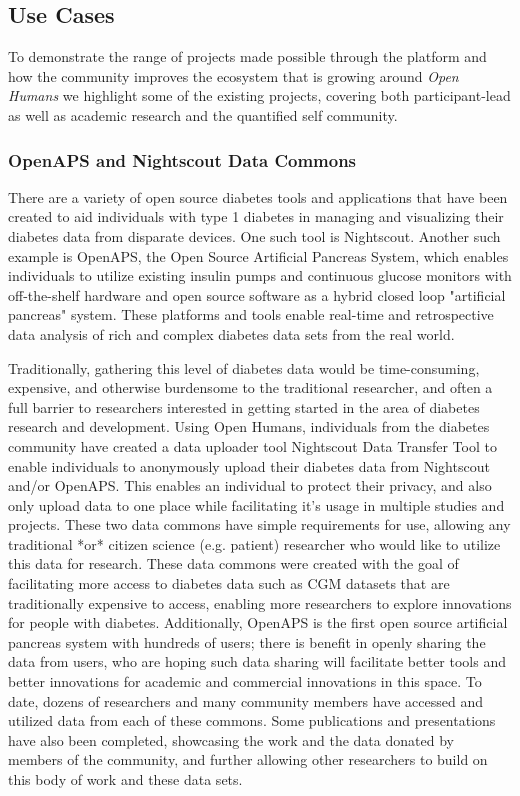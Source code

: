 \documentclass[a4paper,num-refs]{oup-contemporary}
\begin{document}
\subsection{Use Cases}
To demonstrate the range of projects made possible through the platform and how the community improves the ecosystem that is growing around \textit{Open Humans} we highlight some of the existing projects, covering both participant-lead as well as academic research and the quantified self community.

\subsubsection{OpenAPS and Nightscout Data Commons}
There are a variety of open source diabetes tools and applications that have been created to aid individuals with type 1 diabetes in managing and visualizing their diabetes data from disparate devices. One such tool is Nightscout. Another such example is OpenAPS, the Open Source Artificial Pancreas System, which enables individuals to utilize existing insulin pumps and continuous glucose monitors with off-the-shelf hardware and open source software as a hybrid closed loop "artificial pancreas" system. These platforms and tools enable real-time and retrospective data analysis of rich and complex diabetes data sets from the real world. 

Traditionally, gathering this level of diabetes data would be time-consuming, expensive, and otherwise burdensome to the traditional researcher, and often a full barrier to researchers interested in getting started in the area of diabetes research and development. Using {Open Humans}, individuals from the diabetes community have created a data uploader tool {Nightscout Data Transfer Tool} to enable individuals to anonymously upload their diabetes data from Nightscout and/or OpenAPS. This enables an individual to protect their privacy, and also only upload data to one place while facilitating it's usage in multiple studies and projects. These two data commons have simple requirements for use, allowing any traditional *or* citizen science (e.g. patient) researcher who would like to utilize this data for research. These data commons were created with the goal of facilitating more access to diabetes data such as CGM datasets that are traditionally expensive to access, enabling more researchers to explore innovations for people with diabetes. Additionally, OpenAPS is the first open source artificial pancreas system with hundreds of users; there is benefit in openly sharing the data from users, who are hoping such data sharing will facilitate better tools and better innovations for academic and commercial innovations in this space. To date, dozens of researchers and many community members have accessed and utilized data from each of these commons. Some publications and presentations have also been completed, showcasing the work and the data donated by members of the community, and further allowing other researchers to build on this body of work and these data sets.
\end{document}
